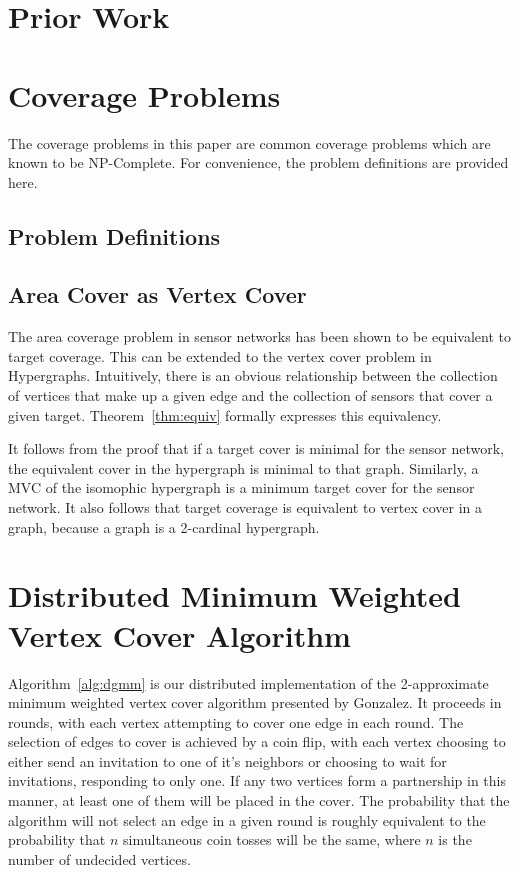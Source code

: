 \section{Prior Work}

\section{Coverage Problems}
The coverage problems in this paper are common coverage problems which are known to be NP-Complete. For convenience, the problem definitions are provided here.
\subsection{Problem Definitions}



\subsection{Area Cover as Vertex Cover}
\label{sec:proof}
The area coverage problem in sensor networks has been shown to be equivalent to target coverage.\cite{IPDPS.2008.45361} This can be extended to the vertex cover problem in Hypergraphs. Intuitively, there is an obvious relationship between the collection of vertices that make up a given edge and the collection of sensors that cover a given target.  Theorem~\ref{thm:equiv} formally expresses this equivalency.



It follows from the proof that if a target cover is minimal for the sensor network, the equivalent cover in the hypergraph is minimal to that graph. Similarly, a MVC of the isomophic hypergraph is a minimum target cover for the sensor network. It also follows that target coverage is equivalent to vertex cover in a graph, because a graph is a 2-cardinal hypergraph.

\section{Distributed Minimum Weighted Vertex Cover Algorithm}
\label{sec:dgmm}
Algorithm~\ref{alg:dgmm} is our distributed implementation of the 2-approximate minimum weighted vertex cover algorithm presented by Gonzalez.\cite{Gonzalez1995129} It proceeds in rounds, with each vertex attempting to cover one edge in each round. The selection of edges to cover is achieved by a coin flip, with each vertex choosing to either send an invitation to one of it's neighbors or choosing to wait for invitations, responding to only one. If any two vertices form a partnership in this manner, at least one of them will be placed in the cover. The probability that the algorithm will not select an edge in a given round is roughly equivalent to the probability that $n$ simultaneous coin tosses will be the same, where $n$ is the number of undecided vertices.

